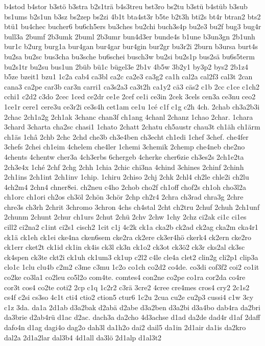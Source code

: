 {b4stod
b4stor
b3stö
b3stra
b2s1trä
b4s3treu
bst3ro
bs2tu
b3stü
b4stüb
b3sub
bs1ums
b2s1un
b3sz
bs2zep
bs2zi
4b1t
bta4st3r
b5te
b2t3h
bti2s
bt4r
btran2
bts2
btü1
bu4chec
bucher6
bu6ch5ers
bu3ches
bu2chi
buch3s4p
bu2e3
bu2f
bug3
bug4r
bull3a
2bumf
2b3umk
2buml
2b3umr
bun4d3er
bunde4s
b1une
b3un3gn
2b1unh
bur1c
b2urg
burg1a
bur4gan
bur4gar
bur4gin
bur2gr
bu3r2i
2burn
b3ursa
burt4s
bu2sa
bu2sc
bus3cha
bu3sche
bu6schei
busch3w
bu2si
bu2s1p
bus2sä
bu6s5term
bu2s1tr
bu2su
bus1un
2büb
bü1c
bügel3e
2b1v
4b5w
3b2y1
by3p2
bys2
2b1z4
b5ze
bzeit1
bzu1
1c2a
cab4
ca3bl
ca2c
ca2e3
ca3g2
ca1h
cal2a
cal2f3
cal3t
2can
cana3
ca2pe
car3b
car3n
carri1
ca3s2a3
ca3t2h
ca1y2
cä3
cäs2
c1b
2cc
c1ce
c1ch2
cchi1
c2d2
c3do
2cec
1ced
ce2dr
ce1e
2cef
ce1i
ce3in
2cek
3cels
cen3a
ce3nu
ceo2
1ce1r
cere1
cere3u
ce3r2i
ce3s4h
cet1am
ce1u
1cé
c1f
c1g
c2h
4ch.
2chab
ch3a2b3i
2chac
2ch1a2g
2ch1ak
3chanc
chan3f
ch1ang
4chanl
2chanz
1chao
2char.
1chara
3chard
3charta
cha2sc
chasi1
1chato
2chatt
2chatu
ch5austr
chau3t
ch1äh
ch1ärm
ch1äs
1châ
2chb
2chc
2chd
che3b
ch3e4ben
ch3echt
ch1edi
1chef
3chef.
che4fer
3chefs
2chei
ch1eim
4chelem
che4ler
1chemi
3chemik
2chemp
che4neb
che2no
4chents
4chentw
cher3a
4ch3erbs
6chergeb
4cherke
cher6zie
ch3es2s
2ch1e2ta
2ch3e4x
1ché
2chf
2chg
2chh
1chia
2chic
chi3na
4chind
3chines
2chinf
2chinh
2ch1ins
2ch1int
2ch1inv
1chip.
1chiru
2chiso
2chj
2chk
2chl4
ch2le
chle2i
ch2lu
4ch2m4
2chn4
chner8ei.
ch2neu
c4ho
2chob
cho2f
ch1off
chof2s
ch1oh
cho3l2a
ch1orc
ch1ori
ch2os
ch3öl
2chön
3chör
2chp
ch2r4
2chra
ch3rad
chra3g
2chre
chre3s
ch3rh
2chrit
3chromo
3chron
4chs
ch4stal
2cht
ch2tru
2chuf
2chuh
2ch1unf
2chunm
2chunt
2chur
ch1urs
2chut
2chü
2chv
2chw
1chy
2chz
ci2ak
ci1c
ci1es
cill2
ci2na2
c1int
ci2s1
cisch2
1cit
c1j
4c2k
ck1a
cka2b
ck2ad
ck2ag
cka2m
cka4r1
ck1ä
ck1eh
ck1ei
cke4na
cken6sem
cke2ra
ck2ere
ck3er4hö
ckerk4
ck2ern
cke2ro
ck1err
cket2t
ck1id
ck1in
ck4is
ck3l
ck3n
ck1o2
ck3ot
ck3ö2
ck3r
cks2al
ck3sc
ck4spen
ck3te
ckt2i
ck1uh
ck1um3
ck1up
c2l2
c4le
cle4a
clet2
clin2g
cli2p1
clip3a
clo1c
1clu
clu4b
c2m2
c3me
c3mu
1c2o
co1ch
co2d2
co4de.
co3di
cof3f2
coi2
co1it
co2ke
co3la1
co2leu
co5l2o
com4te.
comtes4
con2ne
co2pe
co1ra
cor2da
co4re
cor3t
cos4
co2te
coti2
2cp
c1q
1c2r2
c3rä
3cre2
4cree
cre4mes
cros4
cry2
2c1s2
cs4f
c2si
cs3so
4c1t
cti4
ctio2
ction5
ctur6
1c2u
2cua
cu2e
cu2p3
cussi4
c1w
3cy
c1z
3da.
da1a
2d1ab
d3a2bak
d2abä
d2abe
d3a2ben
d3a2bi
d3a4bo
dab4ra
da2bri
da3brie
d2ab4rü
d1ac
d2ac.
dach3a
da2cho
4d3achse
d1ad
da2de
dad4r
d1af
2daff
dafo4n
d1ag
dagi4o
dag2o
dah3l
da1h2o
dai2
dail5
da1in
2d1air
da1is
da2kro
dal2a
2d1a2lar
dal3b4
4d1all
da3lö
2d1alp
d1al3t2
}
